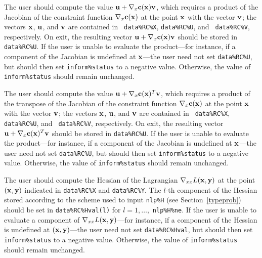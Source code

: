 \documentclass{galahad}
\begin{document}
\begin{description}
 The user should compute the value 
     ${\mathbf{u}} + \nabla_x {\mathbf{c}}({\mathbf{x}}){\mathbf{v}}$, which requires a product of the Jacobian 
     of the constraint function  $\nabla_x {\mathbf{c}}({\mathbf{x}})$ at the
     point ${\mathbf{x}}$ with the vector ${\mathbf{v}}$; the vectors
     ${\mathbf{x}}$, ${\mathbf{u}}$, and ${\mathbf{v}}$ are contained in {\tt
       data\%RC\%X}, {\tt data\%RC\%U}, and {\tt
       data\%RC\%V}, respectively.  On exit, the resulting
     vector ${\mathbf{u}} + \nabla_x {\mathbf{c}}({\mathbf{x}}){\mathbf{v}}$ should be stored in
     {\tt data\%RC\%U}.  If the user is
     unable to evaluate the product---for instance, 
     if a component of the Jacobian is
     undefined at ${\mathbf{x}}$---the user need not set {\tt data\%RC\%U}, but
     should then set {\tt inform\%status} to a negative value.
     Otherwise, the value of {\tt inform\%status} should remain
     unchanged.

 The user should compute the value 
     ${\mathbf{u}} + \nabla_x {\mathbf{c}}({\mathbf{x}})^T{\mathbf{v}}$, which requires a product of
     the transpose of the Jacobian 
     of the constraint function $\nabla_x {\mathbf{c}}({\mathbf{x}})$ at the
     point ${\mathbf{x}}$ with the vector ${\mathbf{v}}$; the vectors
     ${\mathbf{x}}$, ${\mathbf{u}}$, and ${\mathbf{v}}$ are contained in {\tt
       data\%RC\%X}, {\tt data\%RC\%U}, and {\tt
       data\%RC\%V}, respectively.  On exit, the resulting
     vector ${\mathbf{u}} + \nabla_x {\mathbf{c}}({\mathbf{x}})^T{\mathbf{v}}$ should be stored in
     {\tt data\%RC\%U}.  If the user is
     unable to evaluate the product---for instance, 
     if a component of the Jacobian is
     undefined at ${\mathbf{x}}$---the user need not set {\tt data\%RC\%U}, but
     should then set {\tt inform\%status} to a negative value.
     Otherwise, the value of {\tt inform\%status} should remain
     unchanged.

 The user should compute the Hessian 
     of the Lagrangian $\nabla_{xx} L({\mathbf{x}},{\mathbf{y}})$ at the point $({\mathbf{x}},{\mathbf{y}})$ 
     indicated in {\tt data\%RC\%X} and {\tt data\%RC\%Y}.
     The $l$-th component of the Hessian stored according to the
     scheme used to input {\tt nlp\%H} (see Section~\ref{typeprob})
     should be set in {\tt data\%RC\%Hval(l)} 
     for $l = 1, \ldots,$ {\tt  nlp\%H\%ne}.  If the user is
     unable to evaluate a component of $\nabla_{xx} L({\mathbf{x}},{\mathbf{y}})$---for instance, 
     if a component of the Hessian is
     undefined at $({\mathbf{x}},{\mathbf{y}})$---the user need not set {\tt data\%RC\%Hval}, but
     should then set {\tt inform\%status} to a negative value.
     Otherwise, the value of {\tt inform\%status} should remain
     unchanged.


\end{description}
\end{document}
